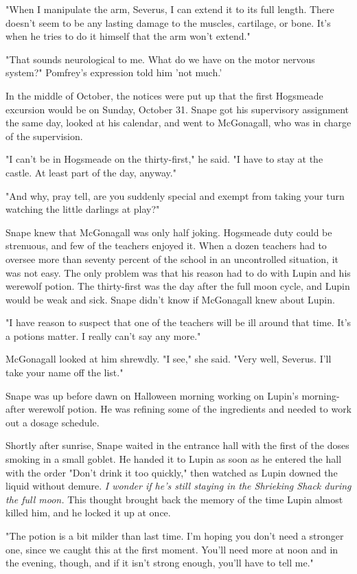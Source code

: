\documentclass[a4paper,11pt]{article}
\begin{document}
"When I manipulate the arm, Severus, I can extend it to its full length. There doesn't seem to be any lasting damage to the muscles, cartilage, or bone. It's when he tries to do it himself that the arm won't extend."

"That sounds neurological to me. What do we have on the motor nervous system?" Pomfrey's expression told him 'not much.'

In the middle of October, the notices were put up that the first Hogsmeade excursion would be on Sunday, October 31. Snape got his supervisory assignment the same day, looked at his calendar, and went to McGonagall, who was in charge of the supervision.

"I can't be in Hogsmeade on the thirty-first," he said. "I have to stay at the castle. At least part of the day, anyway."

"And why, pray tell, are you suddenly special and exempt from taking your turn watching the little darlings at play?"

Snape knew that McGonagall was only half joking. Hogsmeade duty could be strenuous, and few of the teachers enjoyed it. When a dozen teachers had to oversee more than seventy percent of the school in an uncontrolled situation, it was not easy. The only problem was that his reason had to do with Lupin and his werewolf potion. The thirty-first was the day after the full moon cycle, and Lupin would be weak and sick. Snape didn't know if McGonagall knew about Lupin.

"I have reason to suspect that one of the teachers will be ill around that time. It's a potions matter. I really can't say any more."

McGonagall looked at him shrewdly. "I see," she said. "Very well, Severus. I'll take your name off the list."

Snape was up before dawn on Halloween morning working on Lupin's morning-after werewolf potion. He was refining some of the ingredients and needed to work out a dosage schedule.

Shortly after sunrise, Snape waited in the entrance hall with the first of the doses smoking in a small goblet. He handed it to Lupin as soon as he entered the hall with the order "Don't drink it too quickly," then watched as Lupin downed the liquid without demure. \emph{I wonder if he's still staying in the Shrieking Shack during the full moon.} This thought brought back the memory of the time Lupin almost killed him, and he locked it up at once.

"The potion is a bit milder than last time. I'm hoping you don't need a stronger one, since we caught this at the first moment. You'll need more at noon and in the evening, though, and if it isn't strong enough, you'll have to tell me."
\end{document}
